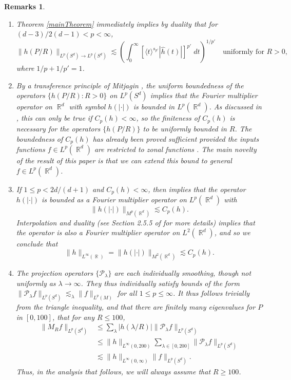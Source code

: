 \documentclass[dvipsnames,letterpaper,12pt]{article}
\DeclareMathOperator{\RR}{\mathbb{R}}
\newtheorem{remarks}[theorem]{Remarks}
\begin{document}
\begin{remarks}
    \ 
\begin{enumerate}
    \item Theorem \ref{mainTheorem} immediately implies by duality that for $(d-3)/2(d-1) < p < \infty$,
    \[ \| h(P/R) \|_{L^p(S^d) \to L^p(S^d)} \lesssim \left( \int_0^\infty \left[ \langle t \rangle^{s_{p'}} |\widehat{h}(t)| \right]^{p'}\; dt \right)^{1/p'} \quad\text{uniformly for $R > 0$}, \]
    where $1/p + 1/p' = 1$.

    \item By a transference principle of Mitjagin \cite{Mitjagin}, the uniform boundedness of the operators $\{ h(P/R) : R > 0 \}$ on $L^p(S^d)$ implies that the Fourier multiplier operator on $\RR^d$ with symbol $h(|\cdot|)$ is bounded in $L^p(\RR^d)$. As discussed in \cite{HeoandNazarovandSeeger}, this can only be true if $C_p(h) < \infty$, so the finiteness of $C_p(h)$ is necessary for the operators $\{ h(P/R) \}$ to be uniformly bounded in $R$. The boundedness of $C_p(h)$ has already been proved sufficient provided the inputs functions $f \in L^p(\RR^d)$ are restricted to \emph{zonal} functions \cite{Alladi}. The main novelty of the result of this paper is that we can extend this bound to general $f \in L^p(\RR^d)$.

    \item If $1 \leq p < 2d/(d+1)$ and $C_p(h) < \infty$, then \cite{HeoandNazarovandSeeger} implies that the operator $h(|\cdot|)$ is bounded as a Fourier multiplier operator on $L^p(\RR^d)$ with
    \[ \| h(|\cdot|) \|_{M^p(\RR^d)} \lesssim C_p(h). \]
    Interpolation and duality (see Section 2.5.5 of \cite{Grafakos} for more details) implies that the operator is also a Fourier multiplier operator on $L^2(\RR^d)$, and so we conclude that
    \[ \| h \|_{L^\infty(\RR)} = \| h( |\cdot| ) \|_{M^2(\RR^d)} \lesssim C_p(h). \]

    \item The projection operators $\{ \mathcal{P}_\lambda \}$ are each individually smoothing, though not uniformly as $\lambda \to \infty$. They thus individually satisfy bounds of the form $\| \mathcal{P}_\lambda f \|_{L^p(S^d)} \lesssim_\lambda \| f \|_{L^p(M)}$ for all $1 \leq p \leq \infty$. It thus follows trivially from the triangle inequality, and that there are finitely many eigenvalues for $P$ in $[0,100]$, that for any $R \leq 100$,
    \begin{align*}
        \| M_R f \|_{L^p(S^d)} &\leq \sum_\lambda |h(\lambda/R)| \| \mathcal{P}_\lambda f \|_{L^p(S^d)}\\
        &\leq \| h \|_{L^\infty(0,200)} \sum\nolimits_{\lambda \in [0,200]} \| \mathcal{P}_\lambda f \|_{L^p(S^d)}\\
        &\lesssim \| h \|_{L^\infty(0,\infty)} \| f \|_{L^p(S^d)}.
    \end{align*}
    Thus, in the analysis that follows, we will always assume that $R \geq 100$.


\end{enumerate}
\end{remarks}
\end{document}
